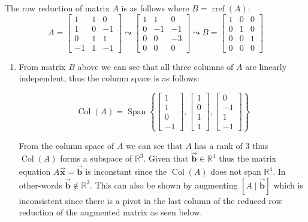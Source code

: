 \documentclass[letter,11pt]{article}
\theoremstyle{definition}
\begin{document}
\begin{tcolorbox}[boxrule=1mm,enhanced jigsaw, breakable,before=\hfill,after=\hfill,adjusted title={Problem 5 solutions}]
The row reduction of matrix $A$ is as follows where $B = \operatorname{rref}\left(A\right)$: 
    $$A=\begin{bmatrix}1 & 1 & 0 \\ 1 & 0 & -1 \\ 0 & 1 & 1 \\ -1 & 1 & -1 \end{bmatrix} \leadsto \begin{bmatrix}1 & 1 & 0 \\ 0 & -1 & -1 \\ 0 & 0 & -3 \\ 0 & 0 & 0 \end{bmatrix} \leadsto B = \begin{bmatrix}1 & 0 & 0 \\ 0 & 1 & 0 \\ 0 & 0 & 1 \\ 0 & 0 & 0 \end{bmatrix}$$
    \tcblower

    \begin{enumerate}[label = \roman*.]
        \item From matrix $B$ above we can see that all three columns of $A$ are linearly independent, thus the column space is as follows: 

        $$\operatorname{Col}\left(A\right) = \operatorname{Span}\left\{\begin{bmatrix} 1 \\ 1\\0 \\-1 \end{bmatrix},\begin{bmatrix} 1 \\ 0 \\1 \\1 \end{bmatrix},\begin{bmatrix} 0 \\ -1 \\1 \\-1 \end{bmatrix} \right\}$$
        
        From the column space of $A$ we can see that $A$ has a rank of 3 thus $\operatorname{Col}\left(A\right)$ forms a subspace of $\mathbb{R}^3$. Given that $\vec{\boldsymbol{b}}\in \mathbb{R}^{4}$ thus the matrix equation $A\vec{\boldsymbol{x}} = \vec{\boldsymbol{b}}$ is inconstant since the $\operatorname{Col}\left(A\right)$ does not span $\mathbb{R}^4$. In other-words $\vec{\boldsymbol{b}}\not\in \mathbb{R}^3$. This can also be shown by augmenting $\left[A\mid \vec{\boldsymbol{b}} \right]$ which is inconsistent since there is a pivot in the last column of the reduced row reduction of the augmented matrix as seen below. 


\end{enumerate}
\end{tcolorbox}
\end{document}
